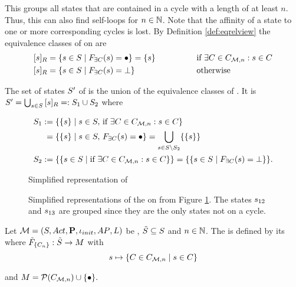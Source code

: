 \documentclass[preview]{standalone}
\begin{document}
This \viewN groups all states that are contained in a cycle with a length of at least $n$. Thus, this \viewN can also find self-loops for $n \in {\mathbb{N}}$. Note that the affinity of a state to one or more corresponding cycles is lost. 
\noindent By Definition \ref{def:eqrelview} the equivalence classes of \eqrelview on \states are
\begin{alignat*}{3}
	\eqclassv &= \{\state \in \states \mid \gfcthascycle(\state) = \remelem\} = \{\state\} \quad\quad\quad\quad&&\text{if } \exists \cycle \in \cycleset : \state \in \cycle \\
	\eqclassv &= \{\state \in \states \mid \gfcthascycle(\state) = \notppty\} &&\text{otherwise}
\end{alignat*}

\noindent The set of states ${S}'$ of \viewhascycle is the union of the equivalence classes of \eqrelview. It is ${S}' = \bigcup_{{s} \in {S}} {{[{s}]_{{R}}}} =: {S}_1 \cup {S}_2$ where

\begin{align*}
	\states_1 &:= \{\{\state\} \mid \state \in \states, \,\text{if } \exists \cycle \in \cycleset : \state \in \cycle\} \\
	&\;= \{\{\state\} \mid \state \in \states, \, \gfcthascycle(\state) = \remelem\} = \nogroupstates \\
	\states_2 &:= \{\{\state \in \states \mid \text{if } \exists \cycle \in \cycleset : \state \in \cycle \}\} = \{\{\state \in \states \mid \gfcthascycle(\state) = \notppty\}\}.
\end{align*}

\begin{figure}[!htb]
	\centering
				
	\caption{Simplified representation of \mdp}
	\label{fig:cyclesBefore} 
\end{figure}

\begin{figure}[!htb]
	\centering
	
	\caption{Simplified representations of the \viewN \viewhascycle on \chgph from Figure \ref{fig:cyclesBefore}. The states ${s}_{12}$ and ${s}_{13}$ are grouped since they are the only states not on a cycle.}
	\label{fig:cycleAfterHas} 
\end{figure}

\begin{definition}
	Let ${{{\mathcal{M}}}} = {{({S}, {Act}, {\textbf{P}}, {\iota_{init}}, {AP}, {L})}}$ be \achgphN, ${\tilde{{S}}} \subseteq {S}$ and $n \in {\mathbb{N}}$. The \viewN \viewexactcycle is defined by its \grpfctN \gfctexactcycle where ${{\tilde{F}_{{\{{C}_n\}}}}} : {\tilde{{S}}} \to {\ensuremath{{M}}}$ with
	\[
	\state \mapsto \{\cycle \in \cycleset \mid \state \in \cycle\}
	\]
	
	and $\imggrp = \powerset{\cycleset}\cup \remset.$
	\label{def:exactcycleview}
\end{definition}
\end{document}
